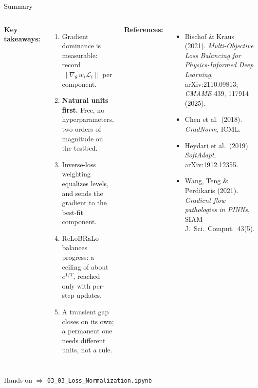 \documentclass[aspectratio=169,11pt]{beamer}
\begin{document}
\begin{frame}{Summary}
\footnotesize
\vspace{-0.4cm}
\begin{columns}[T]
\textbf{Key takeaways:}
\begin{enumerate}\itemsep1pt
    \item Gradient dominance is measurable: record $\|\nabla_\theta\, w_i \mathcal{L}_i\|$ per component.
    \item \textbf{Natural units first.} Free, no hyperparameters, two orders of magnitude on the testbed.
    \item Inverse-loss weighting equalizes levels, and sends the gradient to the best-fit component.
    \item ReLoBRaLo balances progress: a ceiling of about $e^{1/T}$, reached only with per-step updates.
    \item A transient gap closes on its own; a permanent one needs different units, not a rule.
\end{enumerate}

\textbf{References:}
{\scriptsize
\begin{itemize}\itemsep0pt
    \item Bischof \& Kraus (2021). \emph{Multi-Objective Loss Balancing for Physics-Informed Deep Learning}, arXiv:2110.09813; \emph{CMAME} 439, 117914 (2025).
    \item Chen et al.\ (2018). \emph{GradNorm}, ICML.
    \item Heydari et al.\ (2019). \emph{SoftAdapt}, arXiv:1912.12355.
    \item Wang, Teng \& Perdikaris (2021). \emph{Gradient flow pathologies in PINNs}, SIAM J.\ Sci.\ Comput.\ 43(5).
\end{itemize}
}
\end{columns}

\vspace{0.1cm}
\begin{block}{Hands-on}
$\Rightarrow$ \texttt{03\_03\_Loss\_Normalization.ipynb}
\end{block}
\end{frame}
\end{document}
